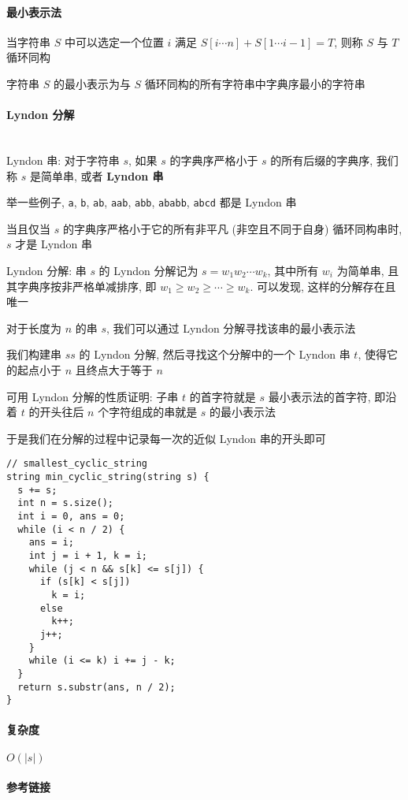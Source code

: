 \paragraph{最小表示法}

当字符串 \(S\) 中可以选定一个位置 \(i\) 满足 \(S[i\cdots n]+S[1\cdots i-1]=T\), 则称 \(S\) 与 \(T\) 循环同构

字符串 \(S\) 的最小表示为与 \(S\) 循环同构的所有字符串中字典序最小的字符串

\paragraph{Lyndon 分解}~\\

Lyndon 串: 对于字符串 \(s\), 如果 \(s\) 的字典序严格小于 \(s\) 的所有后缀的字典序, 我们称 \(s\) 是简单串, 或者 \textbf{Lyndon 串}

举一些例子, \verb|a|, \verb|b|, \verb|ab|, \verb|aab|, \verb|abb|, \verb|ababb|, \verb|abcd| 都是 Lyndon 串

当且仅当 \(s\) 的字典序严格小于它的所有非平凡 (非空且不同于自身) 循环同构串时, \(s\) 才是 Lyndon 串

Lyndon 分解: 串 \(s\) 的 Lyndon 分解记为 \(s=w_1w_2\cdots w_k\), 其中所有 \(w_i\) 为简单串, 且其字典序按非严格单减排序, 即 \(w_1\ge w_2\ge\cdots\ge w_k\). 可以发现, 这样的分解存在且唯一

对于长度为 \(n\) 的串 \(s\), 我们可以通过 Lyndon 分解寻找该串的最小表示法

我们构建串 \(ss\) 的 Lyndon 分解, 然后寻找这个分解中的一个 Lyndon 串 \(t\), 使得它的起点小于 \(n\) 且终点大于等于 \(n\)

可用 Lyndon 分解的性质证明: 子串 \(t\) 的首字符就是 \(s\) 最小表示法的首字符, 即沿着 \(t\) 的开头往后 \(n\) 个字符组成的串就是 \(s\) 的最小表示法

于是我们在分解的过程中记录每一次的近似 Lyndon 串的开头即可

\begin{verbatim}
// smallest_cyclic_string
string min_cyclic_string(string s) {
  s += s;
  int n = s.size();
  int i = 0, ans = 0;
  while (i < n / 2) {
    ans = i;
    int j = i + 1, k = i;
    while (j < n && s[k] <= s[j]) {
      if (s[k] < s[j])
        k = i;
      else
        k++;
      j++;
    }
    while (i <= k) i += j - k;
  }
  return s.substr(ans, n / 2);
}
\end{verbatim}

\paragraph{复杂度}

\(O(|s|)\)

\paragraph{参考链接}

